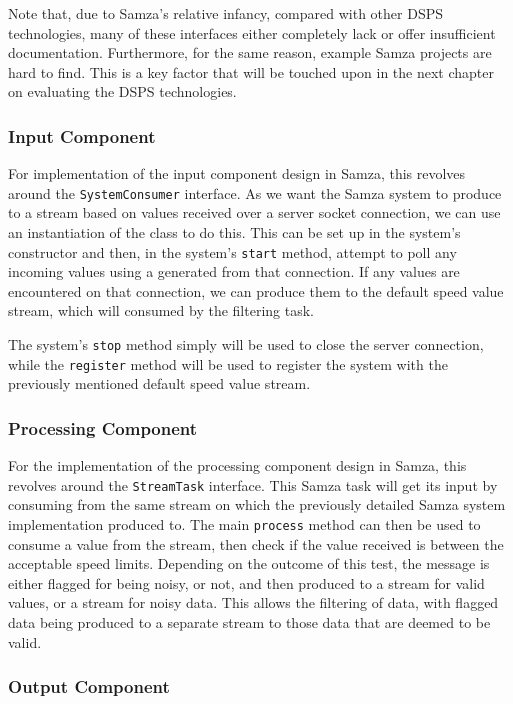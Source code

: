 Note that, due to Samza's relative infancy, compared with other DSPS technologies, many of these interfaces either completely lack
or offer insufficient documentation. Furthermore, for the same reason, example Samza projects are hard to find. This is
a key factor that will be touched upon in the next chapter on evaluating the DSPS technologies.

\subsubsection{Input Component}

For implementation of the input component design in Samza, this revolves around the \texttt{SystemConsumer} interface.
As we want the Samza system to produce to a stream based on values received over a server socket connection, we can use
an instantiation of the  class to do this. This can be set up in the system's constructor
and then, in the system's \texttt{start} method, attempt to poll any incoming values using a  generated
from that connection. If any values are encountered on that connection, we can produce them to the default speed value
stream, which will consumed by the filtering task.

The system's \texttt{stop} method simply will be used to close the server connection, while the \texttt{register} method will
be used to register the system with the previously mentioned default speed value stream.

\subsubsection{Processing Component}

For the implementation of the processing component design in Samza, this revolves around the \texttt{StreamTask} interface.
This Samza task will get its input by consuming from the same stream on which the previously detailed Samza system implementation
produced to. The main \texttt{process} method can then be used to consume a value from the stream, then check if the value
received is between the acceptable speed limits. Depending on the outcome of this test, the message is either flagged for
being noisy, or not, and then produced to a stream for valid values, or a stream for noisy data. This allows the filtering
of data, with flagged data being produced to a separate stream to those data that are deemed to be valid.

\subsubsection{Output Component}

